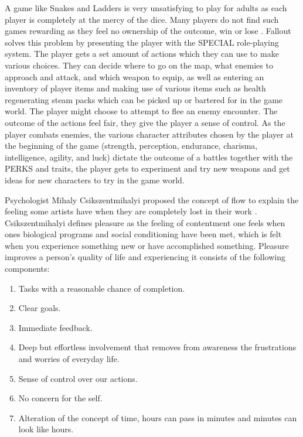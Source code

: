 A game like Snakes and Ladders is very unsatisfying to play for adults as each player is completely at the mercy of the dice. Many players do not find such games rewarding as they feel no ownership of the outcome, win or lose \autocite[85]{hiwiller_players_2016}. Fallout solves this problem by presenting the player with the SPECIAL role-playing system. The player gets a set amount of actions which they can use to make various choices. They can decide where to go on the map, what enemies to approach and attack, and which weapon to equip, as well as entering an inventory of player items and making use of various items such as health regenerating steam packs which can be picked up or bartered for in the game world. The player might choose to attempt to flee an enemy encounter. The outcome of the actions feel fair, they give the player a sense of control. As the player combats enemies, the various character attributes chosen by the player at the beginning of the game (strength, perception, endurance, charisma, intelligence, agility, and luck) dictate the outcome of a battles together with the PERKS and traits, the player gets to experiment and try new weapons and get ideas for new characters to try in the game world.

Psychologist Mihaly Csikszentmihalyi proposed the concept of flow to explain the feeling some artists have when they are completely lost in their work \autocite{inbook}. Csikszentmihalyi defines pleasure as the feeling of contentment one feels when ones biological programs and social conditioning have been met, which is felt when you experience something new or have accomplished something. Pleasure improves a person's quality of life and experiencing it consists of the following components:

\begin{enumerate}
\item Tasks with a reasonable chance of completion.
\item Clear goals.
\item Immediate feedback.
\item Deep but effortless involvement that removes from awareness the frustrations and worries of everyday life.
\item Sense of control over our actions.
\item No concern for the self.
\item Alteration of the concept of time, hours can pass in minutes and minutes can look like hours.
\end{enumerate}

